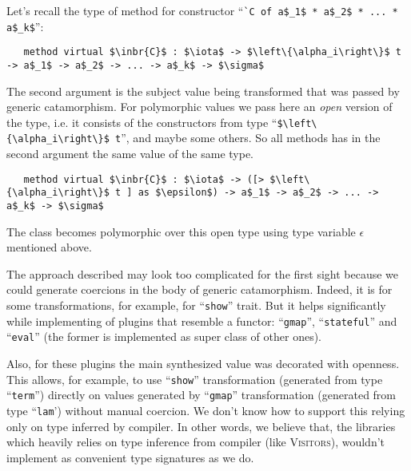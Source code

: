 Let's recall the type of method for constructor ``\lstinline|`C of a$_1$ * a$_2$ * ... * a$_k$|'':
\begin{lstlisting}
   method virtual $\inbr{C}$ : $\iota$ -> $\left\{\alpha_i\right\}$ t -> a$_1$ -> a$_2$ -> ... -> a$_k$ -> $\sigma$
\end{lstlisting}

The second argument is the subject value being transformed that was passed  by generic catamorphism. For polymorphic values we pass here 
an \emph{open} version of the type, i.e. it consists of the constructors from type ``\lstinline|$\left\{\alpha_i\right\}$ t|'', and maybe some others. So all methods has in the second argument the same value of the same type.

\begin{lstlisting}
   method virtual $\inbr{C}$ : $\iota$ -> ([> $\left\{\alpha_i\right\}$ t ] as $\epsilon$) -> a$_1$ -> a$_2$ -> ... -> a$_k$ -> $\sigma$
\end{lstlisting}

The class becomes polymorphic over this open type using type variable $\epsilon$ mentioned above.

The approach described may look too complicated for the first sight because we could generate coercions in the body of generic catamorphism. Indeed, it is for some transformations, for example, for ``\lstinline|show|'' trait. But it helps significantly while implementing of plugins that resemble a functor: ``\lstinline|gmap|'', ``\lstinline|stateful|'' and ``\lstinline|eval|'' (the former is implemented as super class of other ones). 

Also, for these plugins the main synthesized value was decorated with openness. This allows, for example, to use ``\lstinline|show|'' transformation (generated from type ``\lstinline|term|'') directly on values generated by ``\lstinline|gmap|'' transformation (generated from type ``\lstinline|lam|') without manual coercion. We don't know how to support this relying only on type inferred by compiler. In other words, we believe that, the libraries which heavily  relies on type inference from compiler (like \textsc{Visitors}), wouldn't 
implement as convenient type signatures as we do.


